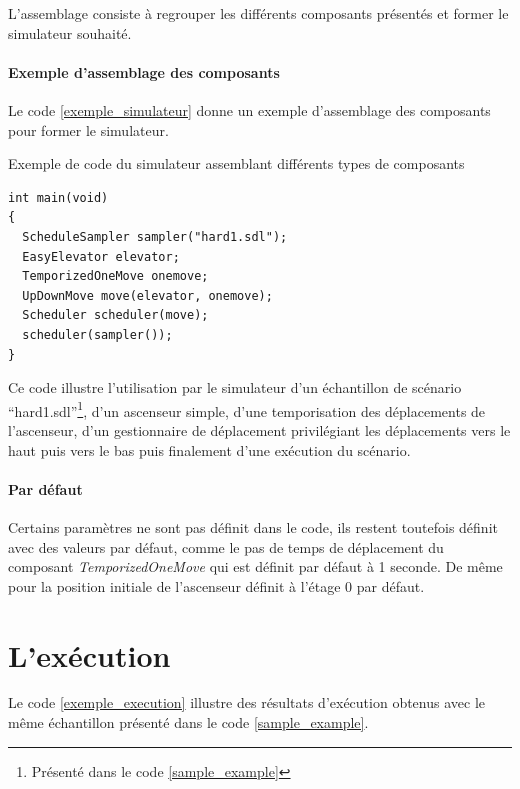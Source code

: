 \documentclass[twocolumn,oneside,10pt]{article}
\begin{document}
L'assemblage consiste à regrouper les différents composants présentés et former le simulateur souhaité.

\paragraph{Exemple d'assemblage des composants}

Le code \ref{exemple_simulateur} donne un exemple d'assemblage des composants pour former le simulateur.

\begin{algorithm}[h]
  \caption{Exemple de code du simulateur assemblant différents types de composants}
  \label{exemple_simulateur}
\begin{verbatim}
int main(void)
{
  ScheduleSampler sampler("hard1.sdl");
  EasyElevator elevator;
  TemporizedOneMove onemove;
  UpDownMove move(elevator, onemove);
  Scheduler scheduler(move);
  scheduler(sampler());
}
\end{verbatim}
\end{algorithm}

Ce code illustre l'utilisation par le simulateur d'un échantillon de scénario ``hard1.sdl''\footnote{Présenté dans le code \ref{sample_example}}, d'un ascenseur simple, d'une temporisation des déplacements de l'ascenseur, d'un gestionnaire de déplacement privilégiant les déplacements vers le haut puis vers le bas puis finalement d'une exécution du scénario.

\paragraph{Par défaut}

Certains paramètres ne sont pas définit dans le code, ils restent toutefois définit avec des valeurs par défaut, comme le pas de temps de déplacement du composant {\em TemporizedOneMove} qui est définit par défaut à 1 seconde. De même pour la position initiale de l'ascenseur définit à l'étage 0 par défaut.

\section{L'exécution}

Le code \ref{exemple_execution} illustre des résultats d'exécution obtenus avec le même échantillon présenté dans le code \ref{sample_example}.
\end{document}
